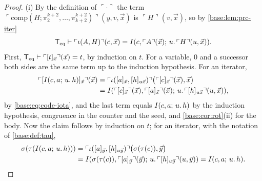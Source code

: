 \begin{proof}
(i) By the definition of $\ulcorner\cdot\urcorner$ the term
$\ulcorner\mathrm{comp}(H;\pi^{k+2}_2,\dots,\pi^{k+2}_{k+2})\urcorner(y,v,\vec x)$
is $\ulcorner H\urcorner(v,\vec x)$, so by \cref{base:lem:prc-iter}
\begin{equation}
 \mathsf{T}_{\mathrm{eq}}\vdash\ulcorner\iota(A,H)\urcorner(c,\vec x)
 =I(c,\ulcorner A\urcorner(\vec x);\,u.\,\ulcorner H\urcorner(u,\vec x)).
 \label{base:eq:code-iota}
\end{equation}
First, $\mathsf{T}_{\mathrm{eq}}\vdash\ulcorner[t]_{\vec x}\urcorner(\vec x)=t$, by induction
on $t$.  For a variable, $0$ and a successor both sides are the same term
up to the induction hypothesis.  For an iterator,
\begin{align*}
 \ulcorner[I(c,a;\,u.\,h)]_{\vec x}\urcorner(\vec x)
 &=\ulcorner\iota([a]_{\vec x},[h]_{u\vec x})\urcorner
   \bigl(\ulcorner[c]_{\vec x}\urcorner(\vec x),\vec x\bigr)\\
 &=I(\ulcorner[c]_{\vec x}\urcorner(\vec x),\ulcorner[a]_{\vec x}\urcorner(\vec x);\,u.\,\ulcorner[h]_{u\vec x}\urcorner(u,\vec x)),
\end{align*}
by \eqref{base:eq:code-iota}, and the last term equals $I(c,a;\,u.\,h)$ by
the induction hypothesis, congruence in the counter and the seed, and
\cref{base:cor:rot}(ii) for the body.  Now the claim follows by induction on
$t$; for an iterator, with the notation of \cref{base:def:tau},
\begin{align*}
 \sigma(\tau(I(c,a;\,u.\,h)))
 &=\ulcorner\iota([a]_{\vec y},[h]_{u\vec y})\urcorner
   \bigl(\sigma(\tau(c)),\vec y\bigr)\\
 &=I(\sigma(\tau(c)),\ulcorner[a]_{\vec y}\urcorner(\vec y);\,u.\,\ulcorner[h]_{u\vec y}\urcorner(u,\vec y))
  =I(c,a;\,u.\,h).
\end{align*}


\end{proof}
